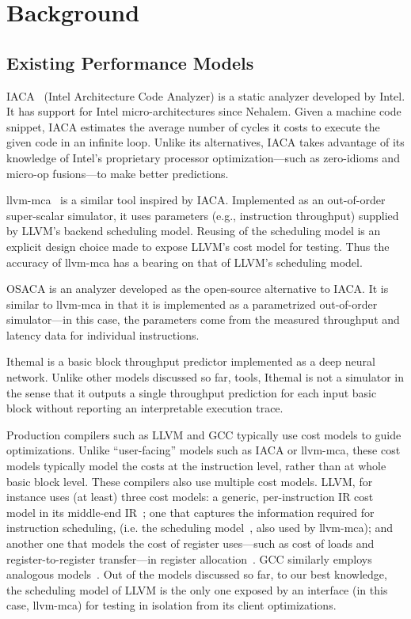 \section{Background}

\subsection{Existing Performance Models}
\label{sec:perf-models}

IACA~\cite{iaca} (Intel Architecture Code Analyzer) is a static analyzer
developed by Intel. It has support for Intel micro-architectures
since Nehalem.
Given a machine code snippet, IACA estimates the average number
of cycles it costs to execute the given code in an infinite 
loop.
Unlike its alternatives, IACA takes advantage of its knowledge
of Intel's proprietary processor optimization---such as zero-idioms and micro-op fusions---to make better 
predictions.

llvm-mca~\cite{llvm-mca} is a similar tool inspired by IACA. 
Implemented as an out-of-order super-scalar simulator,
it uses parameters (e.g., instruction throughput)
supplied by LLVM\cite{llvm}'s backend scheduling model.
Reusing of the scheduling model is an explicit design choice
made to expose LLVM's cost model for testing.
Thus the accuracy of llvm-mca has a bearing on
that of LLVM's scheduling model.

OSACA\cite{osaca} is an analyzer developed as the open-source
alternative to IACA. It is similar to llvm-mca in that
it is implemented as a parametrized out-of-order simulator---in
this case, the parameters come from the measured throughput
and latency data for individual instructions.

Ithemal\cite{ithemal} is a basic block throughput predictor
implemented as a deep neural network. Unlike other models discussed so far, 
tools, Ithemal is not a simulator in the sense that it outputs
a single throughput prediction for each input basic block
without reporting an interpretable execution trace.

Production compilers such as LLVM\cite{llvm} and GCC typically use cost models 
to guide optimizations.
Unlike ``user-facing'' models such as IACA or llvm-mca, these cost models typically
model the costs at the instruction level, rather than at whole basic block level.
These compilers also use multiple cost models.
LLVM, for instance uses (at least) three cost models: 
a generic, per-instruction IR cost model in its middle-end IR~\cite{llvm-cost};
one that captures the information required for instruction scheduling,
(i.e. the scheduling model~\cite{llvm-sched}, also used by llvm-mca);
and another one that models the cost of register uses---such as cost of loads
and register-to-register transfer---in register allocation~\cite{llvm-reg}.
GCC similarly employs analogous models~\cite{gcc-cost,gcc-sched}.
Out of the models discussed so far, to our best knowledge, 
the scheduling model of LLVM is the only one exposed by an interface
(in this case, llvm-mca) for testing in isolation from its client optimizations.


